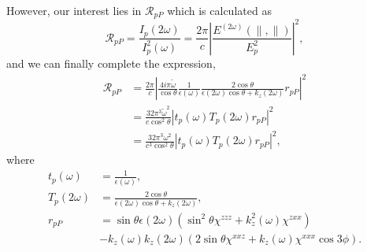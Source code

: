 \documentclass[10pt]{article}
\begin{document}
However, our interest lies in $\mathcal{R}_{pP}$ which is calculated as
\begin{equation*}
\mathcal{R}_{pP}
  = \frac{I_{p}{(2\omega)}}{I_{p}^{2}(\omega)}
  = \frac{2\pi}{c}
  \left\vert
  \frac{E^{(2\omega)}(\parallel,\parallel)}{E^{2}_{p}}
  \right\vert^{2},
\end{equation*}
and we can finally complete the expression,
\begin{align}
\mathcal{R}_{pP}
&= \frac{2\pi}{c}
   \left\vert
   \frac{4i\pi\tilde{\omega}}{\cos\theta}
   \frac{1}{\epsilon(\omega)}
   \frac{2\cos\theta}{\epsilon(2\omega)\cos\theta + k_{z}(2\omega)}r_{pP}
   \right\vert^{2}\nonumber\\
&= \frac{32\pi^{3}\tilde{\omega}^{2}}{c\cos^{2}\theta}
   \left\vert t_{p}(\omega)T_{p}(2\omega)r_{pP}\right\vert^{2}\nonumber\\
&= \frac{32\pi^{3}\omega^{2}}{c^{3}\cos^{2}\theta}
   \left\vert t_{p}(\omega)T_{p}(2\omega)r_{pP}\right\vert^{2},\label{RpP}
\end{align}
where
\begin{equation*}
\begin{split}
t_{p}(\omega)
&= \frac{1}{\epsilon(\omega)},\\
T_{p}(2\omega)
&= \frac{2\cos\theta}{\epsilon(2\omega)\cos\theta + k_{z}(2\omega)},\\
r_{pP} &= \sin\theta\epsilon(2\omega)
(\sin^{2}\theta\chi^{zzz} + k^{2}_{z}(\omega)\chi^{zxx})\\
&- k_{z}(\omega)k_{z}(2\omega)
(2\sin\theta\chi^{xxz} + k_{z}(\omega)\chi^{xxx}\cos3\phi).
\end{split}
\end{equation*}
\end{document}

